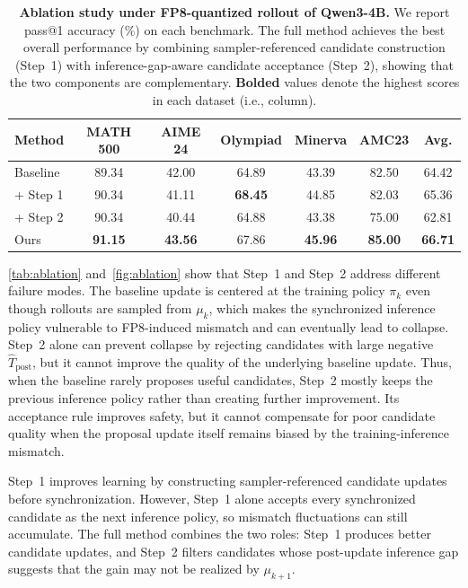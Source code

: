 \begin{table}[tbhp]
\centering
\caption{\textbf{Ablation study under FP8-quantized rollout of Qwen3-4B.} 
We report pass@1 accuracy (\%) on each benchmark.
The full method achieves the best overall performance by combining sampler-referenced candidate construction (Step~1) with inference-gap-aware candidate acceptance (Step~2), showing that the two components are complementary.
\textbf{Bolded} values denote the highest scores in each dataset (i.e., column).}
\vspace{0.2cm}
\label{tab:ablation}
\begin{tabular}{lcccccc}
\toprule
\textbf{Method} & \textbf{MATH 500} & \textbf{AIME 24} & \textbf{Olympiad} & \textbf{Minerva} & \textbf{AMC23} & \textbf{Avg.} \\
\midrule
Baseline        & 89.34 & 42.00 & 64.89 & 43.39 & 82.50 & 64.42 \\
+ Step 1    & 90.34 & 41.11 & \textbf{68.45} & 44.85 & 82.03 & 65.36 \\
+ Step 2    & 90.34 & 40.44 & 64.88 & 43.38 & 75.00 & 62.81 \\
\rowcolor{orange!20}Ours & \textbf{91.15} & \textbf{43.56} & 67.86 & \textbf{45.96} & \textbf{85.00} & \textbf{66.71} \\
\bottomrule
\end{tabular}
\end{table}

\autoref{tab:ablation} and~\autoref{fig:ablation} show that Step~1 and Step~2 address different failure modes.
The baseline update is centered at the training policy $\pi_k$ even though rollouts are sampled from $\mu_k$, which makes the synchronized inference policy vulnerable to FP8-induced mismatch and can eventually lead to collapse.
Step~2 alone can prevent collapse by rejecting candidates with large negative $\widehat{T}_{\mathrm{post}}$, but it cannot improve the quality of the underlying baseline update.
Thus, when the baseline rarely proposes useful candidates, Step~2 mostly keeps the previous inference policy rather than creating further improvement.
Its acceptance rule improves safety, but it cannot compensate for poor candidate quality when the proposal update itself remains biased by the training-inference mismatch.

Step~1 improves learning by constructing sampler-referenced candidate updates before synchronization.
However, Step~1 alone accepts every synchronized candidate as the next inference policy, so mismatch fluctuations can still accumulate.
The full method combines the two roles: Step~1 produces better candidate updates, and Step~2 filters candidates whose post-update inference gap suggests that the gain may not be realized by $\mu_{k+1}$.

